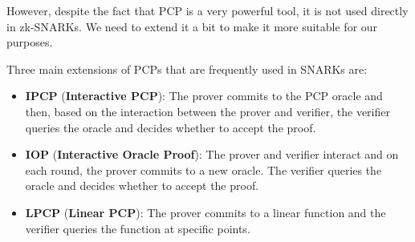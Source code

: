 \documentclass[../lecture-notes.tex]{subfiles}
\begin{document}
However, despite the fact that PCP is a very powerful tool, it is not used directly in zk-SNARKs. We need to extend it a bit to make it more suitable for our purposes.

Three main extensions of PCPs that are frequently used in SNARKs are:
\begin{itemize}
    \item \textbf{IPCP} (\textbf{Interactive PCP}): The prover commits to the PCP oracle and then, based on the interaction between the prover and verifier, the verifier queries the oracle and decides whether to accept the proof.
    \item \textbf{IOP} (\textbf{Interactive Oracle Proof}): The prover and verifier interact and on each round, the prover commits to a new oracle. The verifier queries the oracle and decides whether to accept the proof.
    \item \textbf{LPCP} (\textbf{Linear PCP}): The prover commits to a linear function and the verifier queries the function at specific points.
\end{itemize}
\end{document}
